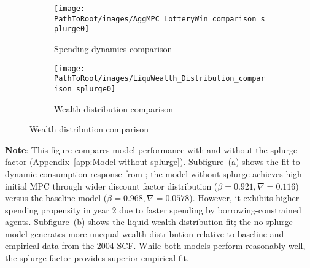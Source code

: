 \documentclass[\PathToRoot/\ProjectName]{subfiles}
\begin{document}
\begin{figure}[H]
  \centering
  \caption{Model performance with and without splurge factor}
  \whenintegrated{\label{fig:splurge0_Norwayestimation}} 
  \noindent\begin{minipage}{\textwidth}
    \centering
    \begin{subfigure}[b]{.5\linewidth}
      \centering
      \texttt{[image: \\PathToRoot/images/AggMPC\_LotteryWin\_comparison\_splurge0]}
      \caption{Spending dynamics comparison}
      \whenintegrated{\label{fig:aggmpclotterywin_splurge0}} 
    \end{subfigure}
    \begin{subfigure}[b]{.5\linewidth}
      \centering
      \texttt{[image: \\PathToRoot/images/LiquWealth\_Distribution\_comparison\_splurge0]}
      \caption{Wealth distribution comparison}
      \whenintegrated{\label{fig:liquwealthdistribution_splurge0}} 
    \end{subfigure}
  \end{minipage}
\end{figure}
\noindent\parbox{\textwidth}{
  \medskip
  \footnotesize \textbf{Note}: This figure compares model performance with and without the splurge factor (Appendix~\ref{app:Model-without-splurge}).
  Subfigure~(a) shows the fit to dynamic consumption response from \cite{fagereng-mpc-2021};
  the model without splurge achieves high initial MPC through wider discount factor distribution
  ($\beta = 0.921, \nabla = 0.116$) versus the baseline model ($\beta = 0.968, \nabla = 0.0578$).
  However, it exhibits higher spending propensity in year 2 due to faster spending by borrowing-constrained agents.
  Subfigure~(b) shows the liquid wealth distribution fit; the no-splurge model generates
  more unequal wealth distribution relative to baseline and empirical data from the 2004 SCF.
  While both models perform reasonably well, the splurge factor provides superior empirical fit.
}
\medskip\medskip

\smartbib
\end{document}
